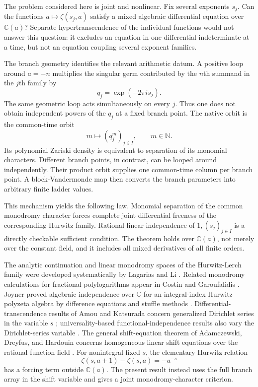 \documentclass[11pt,reqno]{amsart}
\theoremstyle{definition}
\theoremstyle{remark}
\newcommand{\C}{\mathbb C}
\newcommand{\N}{\mathbb N}
\begin{document}
The problem considered here is joint and nonlinear.  Fix several exponents
$s_j$.  Can the functions $a\mapsto\zeta(s_j,a)$ satisfy a mixed algebraic
differential equation over $\C(a)$?  Separate hypertranscendence of the
individual functions would not answer this question: it excludes an equation
in one differential indeterminate at a time, but not an equation coupling
several exponent families.

The branch geometry identifies the relevant arithmetic datum.  A positive
loop around $a=-n$ multiplies the singular germ contributed by the $n$th
summand in the $j$th family by
\begin{equation}\label{eq:qj-intro}
  q_j=\exp(-2\pi i s_j).
\end{equation}
The same geometric loop acts simultaneously on every $j$.  Thus one does not
obtain independent powers of the $q_j$ at a fixed branch point.  The native
orbit is the common-time orbit
\[
  m\longmapsto(q_j^m)_{j\in I},\qquad m\in\N.
\]
Its polynomial Zariski density is equivalent to separation of its monomial
characters.  Different branch points, in contrast, can be looped around
independently.  Their product orbit supplies one common-time column per branch
point.  A block-Vandermonde map then converts the branch parameters into
arbitrary finite ladder values.

This mechanism yields the following law.  Monomial separation of the common
monodromy character forces complete joint differential freeness of the
corresponding Hurwitz family.  Rational linear independence of
$1,(s_j)_{j\in I}$ is a directly checkable sufficient condition.  The theorem
holds over $\C(a)$, not merely over the constant field, and it includes all
mixed derivatives of all finite orders.

The analytic continuation and linear monodromy spaces of the Hurwitz-Lerch
family were developed systematically by Lagarias and Li
\cite{LagariasLiII,LagariasLiIII}.  Related monodromy calculations for
fractional polylogarithms appear in Costin and Garoufalidis
\cite{CostinGaroufalidis}.  Joyner proved algebraic independence over $\C$ for
an integral-index Hurwitz polyzeta algebra by difference equations and
stuffle methods \cite{Joyner}.  Differential-transcendence results of Amou
and Katsurada concern generalized Dirichlet series in the variable $s$
\cite{AmouKatsurada}; universality-based functional-independence results also
vary the Dirichlet-series variable \cite{Laurincikas}.  The general
shift-equation theorem of Adamczewski, Dreyfus, and Hardouin concerns
homogeneous linear shift equations over the rational function field
\cite{ADH}.  For nonintegral fixed $s$, the elementary Hurwitz relation
\[
  \zeta(s,a+1)-\zeta(s,a)=-a^{-s}
\]
has a forcing term outside $\C(a)$.  The present result instead uses the full
branch array in the shift variable and gives a joint monodromy-character
criterion.
\end{document}
